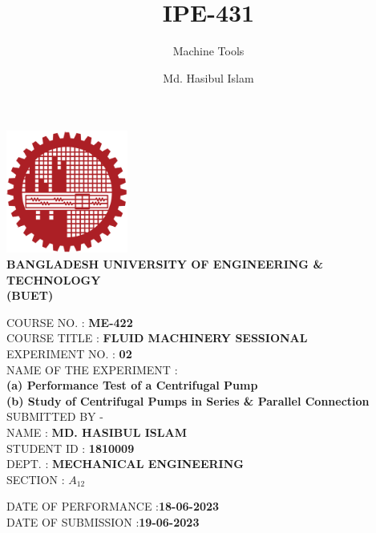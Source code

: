 \documentclass[14pt]{article}
\title{IPE-431}
\author{Md. Hasibul Islam}
\subtitle{Machine Tools}
\date{}
\begin{document}
\begin{titlepage}
    \centering
    \includegraphics[width=4cm]{institution_logo.jpg}\\
    \vspace*{1cm}
    \textbf{\MakeTextUppercase{Bangladesh University of Engineering \& Technology}} \\

    \textbf{\MakeTextUppercase{(BUET)}} \\
    \vspace*{2cm}
    \raggedright
    \MakeTextUppercase{Course No.} : \textbf{ME-422}\\
    \vspace*{0.5cm}
    \MakeTextUppercase{Course Title} : \textbf{FLUID MACHINERY SESSIONAL} \\ 
    \vspace*{1cm}
    \MakeTextUppercase{Experiment No.} : \textbf{02} \\
    \vspace*{0.5cm}
    \MakeTextUppercase{Name of the Experiment} :  \\
    \hspace*{1cm} \textbf{(a) Performance Test of a Centrifugal Pump} \\
    \hspace*{1cm} \textbf{(b) Study of Centrifugal Pumps in Series \& Parallel Connection} \\
    \vspace*{3.5cm} 
    \MakeTextUppercase{Submitted By -} \\
    \vspace*{0.5cm}
    \MakeTextUppercase{Name}        : \hspace{2cm}\textbf{MD. HASIBUL ISLAM} \\
    \vspace*{0.5cm}
    \MakeTextUppercase{Student id}  : \hspace{1cm}\textbf{1810009} \\
    \vspace*{0.5cm}
    \MakeTextUppercase{Dept.}       : \hspace{2cm}\textbf{MECHANICAL ENGINEERING} \\
    \vspace*{0.5cm}
    \MakeTextUppercase{section}     : \hspace{1.5cm}\textbf{$A_{12}$} \\

    \vspace*{2cm}

    \MakeTextUppercase{Date of Performance}     :\hspace{1.5cm}\textbf{18-06-2023}\\
    \vspace*{0.5cm}
    \MakeTextUppercase{Date of Submission}      :\hspace{2cm}\textbf{19-06-2023}\\

    \vfill
\end{titlepage}
\end{document}
